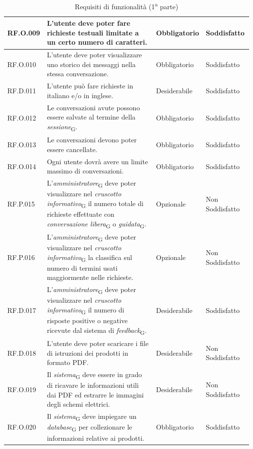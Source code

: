 \begin{table}[H]
\centering
    \begin{tabular}{|C{2.7cm}|L{6.5cm}|C{2.7cm}|C{2.7cm}|}
        \hline
        RF.O.009 & L’utente deve poter fare richieste testuali limitate a un certo numero di caratteri. & Obbligatorio & Soddisfatto \\
        \hline
        RF.O.010 & L’utente deve poter visualizzare uno storico dei messaggi nella stessa
        conversazione. & Obbligatorio & Soddisfatto \\
        \hline
        RF.D.011 & L’utente può fare richieste in italiano e/o in inglese.
         & Desiderabile & Soddisfatto \\
         \hline
         RF.O.012 & Le conversazioni avute possono essere salvate al termine della \textit{sessione}\textsubscript{G}. & Obbligatorio & Soddisfatto \\
        \hline
        RF.O.013 & Le conversazioni devono poter essere cancellate. & Obbligatorio & Soddisfatto \\
        \hline
        RF.O.014 & Ogni utente dovrà avere un limite massimo di conversazioni.
         & Obbligatorio & Soddisfatto \\
        \hline
        RF.P.015 & L'\textit{amministratore}\textsubscript{G} deve poter visualizzare nel \textit{cruscotto informativo}\textsubscript{G} il numero totale di richieste effettuate con \textit{conversazione libera}\textsubscript{G} o \textit{guidata}\textsubscript{G}.
         & Opzionale & Non Soddisfatto \\
        \hline
        RF.P.016 & L'\textit{amministratore}\textsubscript{G} deve poter visualizzare nel \textit{cruscotto informativo}\textsubscript{G} la classifica sul numero di termini usati maggiormente nelle richieste.
         & Opzionale & Non Soddisfatto \\
        \hline
        RF.D.017 & L'\textit{amministratore}\textsubscript{G} deve poter visualizzare nel \textit{cruscotto informativo}\textsubscript{G} il numero di risposte positive o negative ricevute dal sistema di \textit{feedback}\textsubscript{G}.
         & Desiderabile & Soddisfatto \\
        \hline
         RF.D.018 & L'utente deve poter scaricare i file di istruzioni dei prodotti in formato PDF.
         & Desiderabile & Non Soddisfatto \\
        \hline
        
         RF.O.019 & Il \textit{sistema}\textsubscript{G} deve essere in grado di ricavare le informazioni utili dai PDF ed estrarre le immagini degli schemi elettrici.
         & Desiderabile & Non Soddisfatto \\
        \hline
         RF.O.020 & Il \textit{sistema}\textsubscript{G} deve impiegare un \textit{database}\textsubscript{G} per collezionare le informazioni relative ai prodotti.
         & Obbligatorio & Soddisfatto \\
        \hline
        \end{tabular}
    \caption{Requisiti di funzionalità (1\textsuperscript{a}  parte)}
\end{table}
